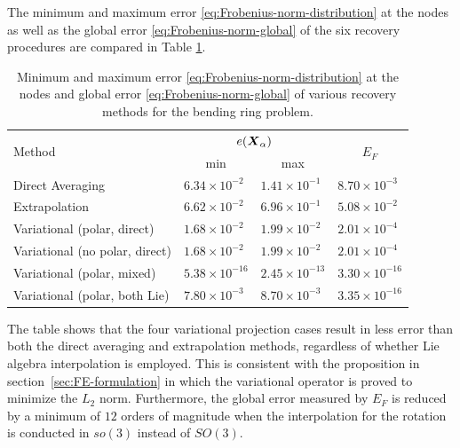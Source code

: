 \documentclass[12pt]{article}
\begin{document}
The minimum and maximum error \eqref{eq:Frobenius-norm-distribution} at the
nodes as well as the global error \eqref{eq:Frobenius-norm-global} of the six
recovery procedures are compared in Table \ref{tab:ring-error-comparison}.

\begin{table}[htbp]
  \begin{center}
    \begin{tabular}{ l l l l }
      \toprule      
      \multirow{2}{*}{Method}
      &
      \multicolumn{2}{c}{$e({\boldsymbol{X}}_{\alpha})$}
      & 
      \multicolumn{1}{c}{\multirow{2}{*}{$E_{F}$}}
      \\
      &
      \multicolumn{1}{c}{min}
      &
      \multicolumn{1}{c}{max}
      &
      \\
      \hline
      Direct Averaging
      &
      $6.34 \times 10^{-2}$
      &
      $1.41 \times 10^{-1}$
      & 
      $8.70 \times 10^{-3}$
      \\
      Extrapolation   
      &
      $6.62 \times 10^{-2}$
      &
      $6.96 \times 10^{-1}$
      &
      $5.08 \times 10^{-2}$
      \\
      Variational (polar, direct)
      &
      $1.68 \times 10^{-2}$
      &
      $1.99 \times 10^{-2}$
      & 
      $2.01 \times 10^{-4}$
      \\
      Variational (no polar, direct)
      &
      $1.68 \times 10^{-2}$
      &
      $1.99 \times 10^{-2}$
      & 
      $2.01 \times 10^{-4}$
      \\
      Variational (polar, mixed)  
      &
      $5.38 \times 10^{-16}$
      &
      $2.45 \times 10^{-13}$
      & 
      $3.30 \times 10^{-16}$
      \\
      Variational (polar, both Lie)  
      &
      $7.80 \times 10^{-3}$
      &
      $8.70 \times 10^{-3}$
      & 
      $3.35 \times 10^{-16}$
      \\
      \bottomrule
    \end{tabular}
    \caption{Minimum and maximum error
      \eqref{eq:Frobenius-norm-distribution} at the nodes and global error
      \eqref{eq:Frobenius-norm-global} of various recovery methods for
      the bending ring problem.}
    \label{tab:ring-error-comparison}
  \end{center}
\end{table}

The table shows that the four variational projection cases result in less error
than both the direct averaging and extrapolation methods, regardless of whether
Lie algebra interpolation is employed. This is consistent with the proposition
in section~\ref{sec:FE-formulation} in which the variational operator is proved
to minimize the $L_2$ norm. Furthermore, the global error measured by $E_{F}$ is
reduced by a minimum of $12$ orders of magnitude when the interpolation for the
rotation is conducted in $so(3)$ instead of $SO(3)$.
\end{document}
